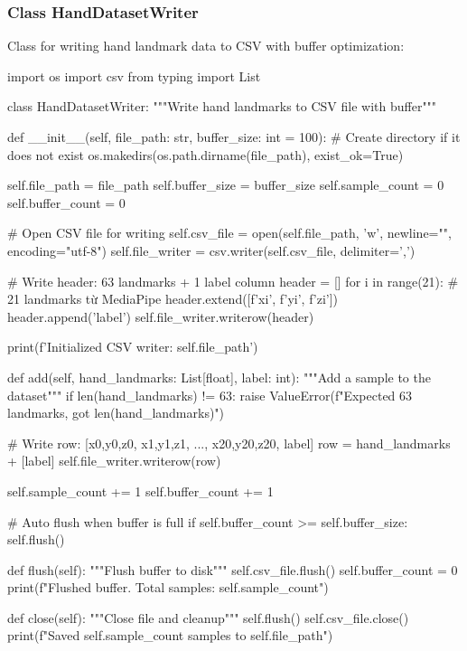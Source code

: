 \subsubsection{Class HandDatasetWriter}

Class for writing hand landmark data to CSV with buffer optimization:

\begin{aivncodebox}
\begin{python}
import os
import csv
from typing import List

class HandDatasetWriter:
    """Write hand landmarks to CSV file with buffer"""
    
    def __init__(self, file_path: str, buffer_size: int = 100):
        # Create directory if it does not exist
        os.makedirs(os.path.dirname(file_path), exist_ok=True)
        
        self.file_path = file_path
        self.buffer_size = buffer_size
        self.sample_count = 0
        self.buffer_count = 0

        # Open CSV file for writing
        self.csv_file = open(self.file_path, 'w', newline="", encoding="utf-8") 
        self.file_writer = csv.writer(self.csv_file, delimiter=',')

        # Write header: 63 landmarks + 1 label column
        header = []
        for i in range(21):  # 21 landmarks từ MediaPipe
            header.extend([f'x{i}', f'y{i}', f'z{i}'])
        header.append('label')
        self.file_writer.writerow(header)

        print(f'Initialized CSV writer: {self.file_path}')
    
    def add(self, hand_landmarks: List[float], label: int):
        """Add a sample to the dataset"""
        if len(hand_landmarks) != 63:
            raise ValueError(f"Expected 63 landmarks, got {len(hand_landmarks)}")
        
        # Write row: [x0,y0,z0, x1,y1,z1, ..., x20,y20,z20, label]
        row = hand_landmarks + [label]
        self.file_writer.writerow(row)
        
        self.sample_count += 1
        self.buffer_count += 1
        
        # Auto flush when buffer is full
        if self.buffer_count >= self.buffer_size:
            self.flush()
    
    def flush(self):
        """Flush buffer to disk"""
        self.csv_file.flush()
        self.buffer_count = 0
        print(f"Flushed buffer. Total samples: {self.sample_count}")
    
    def close(self):
        """Close file and cleanup"""
        self.flush()
        self.csv_file.close()
        print(f"Saved {self.sample_count} samples to {self.file_path}")
\end{python}
\end{aivncodebox}

